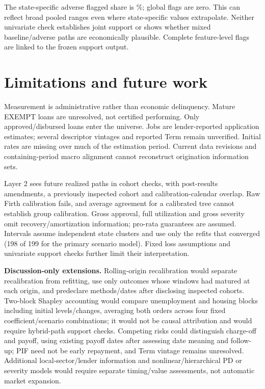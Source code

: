 The state-specific adverse flagged share is \SupportShare\%; global flags are zero. This can reflect broad pooled ranges even where state-specific values extrapolate. Neither univariate check establishes joint support or shows whether mixed baseline/adverse paths are economically plausible. Complete feature-level flags are linked to the frozen support output.

\section{Limitations and future work}
Measurement is administrative rather than economic delinquency. Mature EXEMPT loans are unresolved, not certified performing. Only approved/disbursed loans enter the universe. Jobs are lender-reported application estimates; several descriptor vintages and reported Term remain unverified. Initial rates are missing over much of the estimation period. Current data revisions and containing-period macro alignment cannot reconstruct origination information sets.

Layer 2 sees future realized paths in cohort checks, with post-results amendments, a previously inspected cohort and calibration-calendar overlap. Raw Firth calibration fails, and average agreement for a calibrated tree cannot establish group calibration. Gross approval, full utilization and gross severity omit recovery/amortization information; pro-rata guarantees are assumed. Intervals assume independent state clusters and use only the refits that converged (198 of 199 for the primary scenario model). Fixed loss assumptions and univariate support checks further limit their interpretation.

\textbf{Discussion-only extensions.} Rolling-origin recalibration would separate recalibration from refitting, use only outcomes whose windows had matured at each origin, and predeclare methods/dates after disclosing inspected cohorts. Two-block Shapley accounting would compare unemployment and housing blocks including initial levels/changes, averaging both orders across four fixed coefficient/scenario combinations; it would not be causal attribution and would require hybrid-path support checks. Competing risks could distinguish charge-off and payoff, using existing payoff dates after assessing date meaning and follow-up; PIF need not be early repayment, and Term vintage remains unresolved. Additional local-sector/lender information and nonlinear/hierarchical PD or severity models would require separate timing/value assessments, not automatic market expansion.

